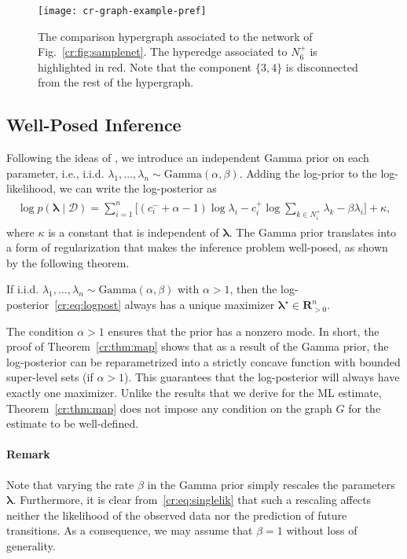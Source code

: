 \begin{figure}[t]
  \centering
  \texttt{[image: cr-graph-example-pref]}
  \caption{The comparison hypergraph associated to the network of Fig.~\ref{cr:fig:samplenet}.
The hyperedge associated to $N^+_6$ is highlighted in red.
Note that the component $\{3, 4\}$ is disconnected from the rest of the hypergraph.}
  \label{cr:fig:samplehyp}
\end{figure}


\subsection{Well-Posed Inference}

Following the ideas of \citet{caron2012efficient}, we introduce an independent Gamma prior on each parameter, i.e., i.i.d. $\lambda_1, \ldots, \lambda_n \sim \text{Gamma}(\alpha, \beta)$.
Adding the log-prior to the log-likelihood, we can write the log-posterior as
\begin{align}
\begin{aligned}
\label{cr:eq:logpost}
\log p(\bm{\lambda} \mid \mathcal{D}) = \sum_{i = 1}^n
  \bigg[ (c^-_i + \alpha - 1) \log \lambda_i
        - c^+_i \log\!\sum_{k \in N^+_i}\!\lambda_k  - \beta \lambda_i \bigg] + \kappa,
\end{aligned}
\end{align}
where $\kappa$ is a constant that is independent of $\bm{\lambda}$.
The Gamma prior translates into a form of regularization that makes the inference problem well-posed, as shown by the following theorem.

\begin{theorem}
\label{cr:thm:map}
If i.i.d. $\lambda_1, \ldots, \lambda_n \sim \text{Gamma}(\alpha, \beta)$ with $\alpha > 1$, then the log-posterior~\eqref{cr:eq:logpost} always has a unique maximizer $\bm{\lambda}^\star \in \mathbf{R}^n_{>0}$.
\end{theorem}

The condition $\alpha > 1$ ensures that the prior has a nonzero mode.
In short, the proof of Theorem~\ref{cr:thm:map} shows that as a result of the Gamma prior, the log-posterior can be reparametrized into a strictly concave function with bounded super-level sets (if $\alpha > 1$).
This guarantees that the log-posterior will always have exactly one maximizer.
Unlike the results that we derive for the ML estimate, Theorem~\ref{cr:thm:map} does not impose any condition on the graph $G$ for the estimate to be well-defined.

\paragraph{Remark}
Note that varying the rate $\beta$ in the Gamma prior simply rescales the parameters $\bm{\lambda}$.
Furthermore, it is clear from~\eqref{cr:eq:singlelik} that such a rescaling affects neither the likelihood of the observed data nor the prediction of future transitions.
As a consequence, we may assume that $\beta = 1$ without loss of generality.
